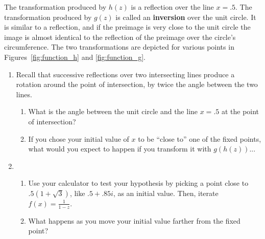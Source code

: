 \documentclass[../textbook.tex]{subfiles}
\begin{document}
\noindent The transformation produced by $h(z)$ is a reflection over the line $x=.5$. The transformation produced by $g(z)$ is called an \textbf{inversion} over the unit circle. It is similar to a reflection, and if the preimage is very close to the unit circle the image is almost identical to the reflection of the preimage over the circle's circumference. The two transformations are depicted for various points in Figures~\ref{fig:function_h} and \ref{fig:function_g}.

\begin{enumerate}
\setcounter{enumi}{\value{problem_i}}
\item Recall that successive reflections over two intersecting lines produce a rotation around the point of intersection, by twice the angle between the two lines.
\begin{enumerate}
\item What is the angle between the unit circle and the line $x=.5$ at the point of intersection?
\item If you chose your initial value of $x$ to be ``close to'' one of the fixed points, what would you expect to happen if you transform it with $g(h(z))$...
\begin{enumerate}
\end{enumerate}
\end{enumerate}
\item \begin{enumerate}
\item Use your calculator to test your hypothesis by picking a point close to $.5(1+\sqrt{3})$, like $.5+.85i$, as an initial value. Then, iterate $f(x)=\frac{1}{1-z}$.
\item What happens as you move your initial value farther from the fixed point?
\end{enumerate}
\setcounter{problem_i}{\value{enumi}}
\end{enumerate}
\end{document}

